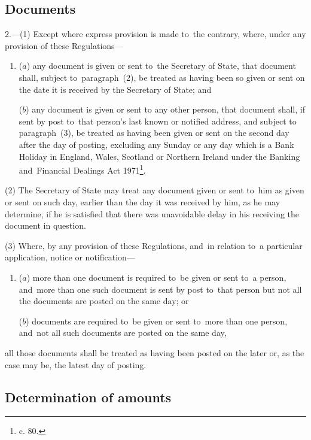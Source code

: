 \documentclass[12pt,a4paper]{article}
\begin{document}
\subsection[2. Documents]{Documents}

2.—(1) Except where express provision is made to~the contrary, where,
under any provision of these Regulations—
\begin{enumerate}\item[]
($a$) any document is given or sent to~the Secretary of State, that document shall,
subject to~paragraph~(2), be treated as having been so given or sent on the date
it is received by the Secretary of State; and

($b$) any document is given or sent to any other person, that document shall, if
sent by post to~that person’s last known or notified address, and subject to
paragraph~(3), be treated as having been given or sent on the second day after
the day of posting, excluding any Sunday or any day which is a Bank Holiday in
England, Wales, Scotland or Northern Ireland under the Banking and~Financial
Dealings Act 1971\footnote{ c. 80.}.
\end{enumerate}

(2) The Secretary of State may treat any document given or sent to~him as given
or sent on such day, earlier than the day it was received by him, as he may
determine, if he is satisfied that there was unavoidable delay in his receiving
the document in question.

(3) Where, by any provision of these Regulations, and~in relation to~a
particular application, notice or notification—
\begin{enumerate}\item[]
($a$) more than one document is required to~be given or sent to~a person, and~more
than one such document is sent by post to~that person but not all the documents
are posted on the same day; or

($b$) documents are required to~be given or sent to~more than one person, and~not
all such documents are posted on the same day,
\end{enumerate}
all those documents shall be treated as having been posted on the later or, as
the case may be, the latest day of posting.

\subsection[3. Determination of amounts]{Determination of amounts}
\end{document}
